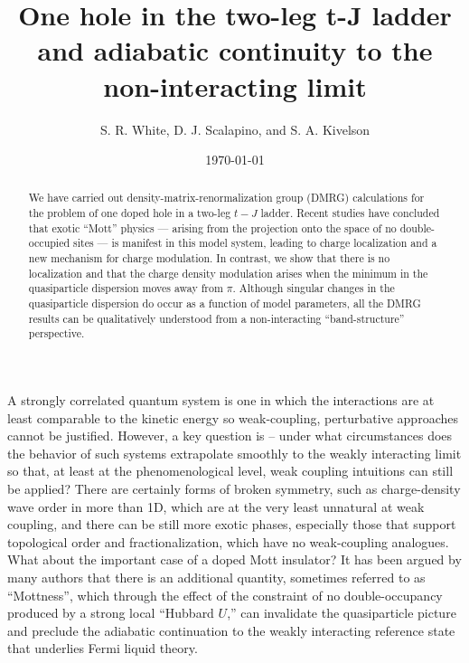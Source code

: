 \documentclass[aps,prb,twocolumn]{revtex4}
\begin{document}
\title{One hole in the two-leg t-J ladder and adiabatic continuity to the non-interacting limit}

\author{S. R. White, D. J. Scalapino, and S. A. Kivelson}
\begin{abstract}
We have carried out density-matrix-renormalization group (DMRG) calculations for
the problem of one doped hole 
in a two-leg $t-J$ ladder. Recent studies have
concluded that exotic ``Mott'' physics --- arising from the projection onto the space
of no double-occupied sites --- is manifest in this model system, leading to charge
localization and a new mechanism for charge modulation. In contrast, we show that
there is no localization and that the charge density modulation arises when
the minimum in the quasiparticle dispersion moves away from $\pi$.
Although singular changes in the quasiparticle dispersion do occur as a function of model parameters, all
the DMRG results can be qualitatively understood from a non-interacting
``band-structure'' perspective.
\end{abstract}
\date{\today }
\maketitle

A strongly correlated quantum system is one in which the interactions are at
least comparable to the kinetic energy so  weak-coupling, perturbative
approaches cannot be justified.  
However, a key question is -- under what circumstances does the behavior of
such systems extrapolate smoothly to the weakly interacting limit so that,  at
least at the phenomenological level, weak coupling intuitions can still be
applied?  There are certainly forms of broken symmetry, such as charge-density
wave order in more than 1D, which are at the very least unnatural at weak
coupling, and  there can be still more exotic phases, especially those that
support topological order and fractionalization, which  have no weak-coupling
analogues. What about the important case of a doped Mott insulator? 
It has been argued by many authors that there is an additional quantity,
sometimes referred to as ``Mottness'', which through the effect of the
constraint of no double-occupancy produced by a strong local ``Hubbard $U$,'' 
can invalidate the quasiparticle picture and preclude the adiabatic
continuation to %
the weakly interacting reference state that underlies Fermi
liquid theory. 
\end{document}
